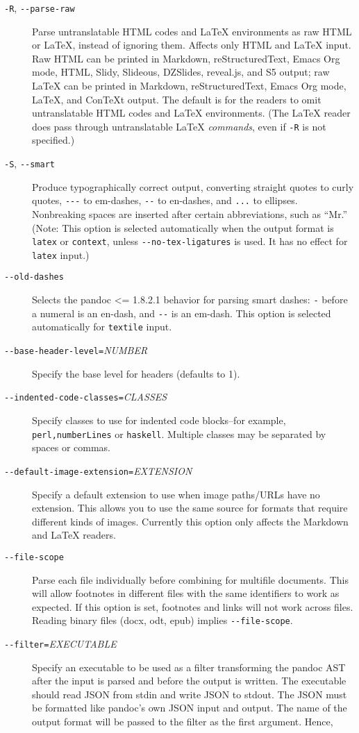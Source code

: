\documentclass[]{article}
\begin{document}
\begin{description}
\item[\texttt{-R}, \texttt{-\/-parse-raw}]
Parse untranslatable HTML codes and LaTeX environments as raw HTML or
LaTeX, instead of ignoring them. Affects only HTML and LaTeX input. Raw
HTML can be printed in Markdown, reStructuredText, Emacs Org mode, HTML,
Slidy, Slideous, DZSlides, reveal.js, and S5 output; raw LaTeX can be
printed in Markdown, reStructuredText, Emacs Org mode, LaTeX, and
ConTeXt output. The default is for the readers to omit untranslatable
HTML codes and LaTeX environments. (The LaTeX reader does pass through
untranslatable LaTeX \emph{commands}, even if \texttt{-R} is not
specified.)
\item[\texttt{-S}, \texttt{-\/-smart}]
Produce typographically correct output, converting straight quotes to
curly quotes, \texttt{-\/-\/-} to em-dashes, \texttt{-\/-} to en-dashes,
and \texttt{...} to ellipses. Nonbreaking spaces are inserted after
certain abbreviations, such as ``Mr.'' (Note: This option is selected
automatically when the output format is \texttt{latex} or
\texttt{context}, unless \texttt{-\/-no-tex-ligatures} is used. It has
no effect for \texttt{latex} input.)
\item[\texttt{-\/-old-dashes}]
Selects the pandoc \textless{}= 1.8.2.1 behavior for parsing smart
dashes: \texttt{-} before a numeral is an en-dash, and \texttt{-\/-} is
an em-dash. This option is selected automatically for \texttt{textile}
input.
\item[\texttt{-\/-base-header-level=}\emph{NUMBER}]
Specify the base level for headers (defaults to 1).
\item[\texttt{-\/-indented-code-classes=}\emph{CLASSES}]
Specify classes to use for indented code blocks--for example,
\texttt{perl,numberLines} or \texttt{haskell}. Multiple classes may be
separated by spaces or commas.
\item[\texttt{-\/-default-image-extension=}\emph{EXTENSION}]
Specify a default extension to use when image paths/URLs have no
extension. This allows you to use the same source for formats that
require different kinds of images. Currently this option only affects
the Markdown and LaTeX readers.
\item[\texttt{-\/-file-scope}]
Parse each file individually before combining for multifile documents.
This will allow footnotes in different files with the same identifiers
to work as expected. If this option is set, footnotes and links will not
work across files. Reading binary files (docx, odt, epub) implies
\texttt{-\/-file-scope}.
\item[\texttt{-\/-filter=}\emph{EXECUTABLE}]
Specify an executable to be used as a filter transforming the pandoc AST
after the input is parsed and before the output is written. The
executable should read JSON from stdin and write JSON to stdout. The
JSON must be formatted like pandoc's own JSON input and output. The name
of the output format will be passed to the filter as the first argument.
Hence,


\end{description}
\end{document}
